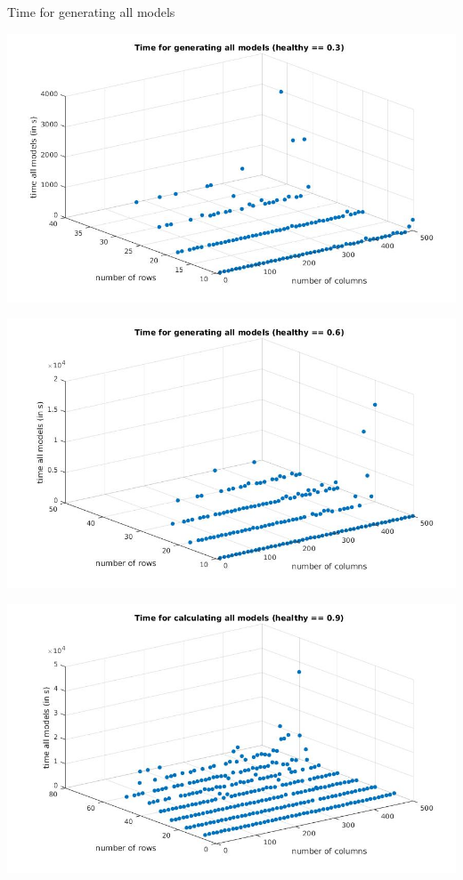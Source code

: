 \documentclass[10pt,dvipsnames]{beamer}
\begin{document}
\begin{frame}{Time for generating all models}
\begin{minipage}{0.5\textwidth}
\includegraphics[scale=0.2]{all_healthy03.jpg}
\end{minipage}
\begin{minipage}{0.4\textwidth}
\includegraphics[scale=0.2]{all_healthy06.jpg}
\end{minipage}
\begin{center}
\includegraphics[scale=0.2]{all_healthy09.jpg}
\end{center}
\end{frame}
\end{document}

